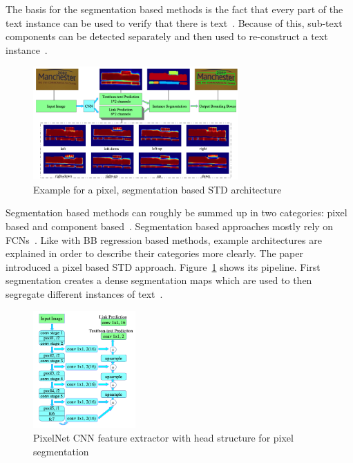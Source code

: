 The basis for the segmentation based methods is the fact that every part of the text instance can
be used to verify that there is text~\citep{long_scene_2021}.
Because of this, sub-text components can be detected separately and then used to re-construct a text
instance~\citep{long_scene_2021}.
\begin{figure}[ht]
    \centering
    \includegraphics[width=0.7\textwidth]{img/STD-seg-based-architecture-Deng-PixelLink-2018.png}
    \caption[Pixel, segmentation based STD architecture]{%
        Example for a pixel, segmentation based STD
        architecture~\citep{deng_pixellink_2018}\label{fig:STD-segbased-pixel-architecture}
    }
\end{figure}
Segmentation based methods can roughly be summed up in two categories: pixel based and component
based~\citep{long_scene_2021}.
Segmentation based approaches mostly rely on \acp{FCN}~\citep{dai_fused_2018}.
Like with \ac{BB} regression based methods, example architectures are explained in order to
describe their categories more clearly.
The paper~\cite{deng_pixellink_2018} introduced a pixel based \ac{STD} approach.
Figure~\ref{fig:STD-segbased-pixel-architecture} shows its pipeline.
First segmentation creates a dense segmentation maps which are used to then segregate different
instances of text~\citep{deng_pixellink_2018}.
\begin{figure}[ht]
    \centering
    \includegraphics[width=0.35\textwidth]{img/STD-seg-based-CNN-Deng-PixelLink-2018.png}
    \caption[Feature extractor and prediction head for pixel segmentation]{%
        PixelNet CNN feature extractor with head structure for pixel
        segmentation\label{fig:STD-segbased-pixel-CNN}
    }
\end{figure}
